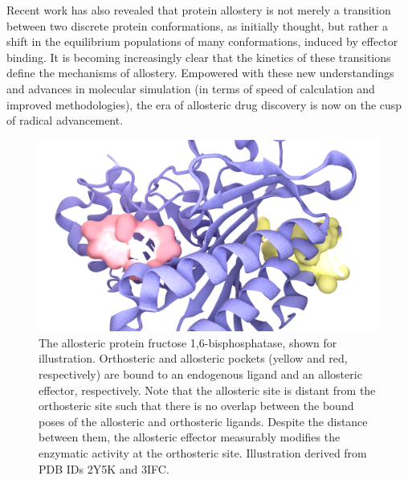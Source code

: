 \par Recent work has also revealed that protein allostery is not merely a transition between two discrete protein conformations, as initially thought, but rather a shift in the equilibrium populations of many conformations, induced by effector binding.\cite{Cooper1984a,Tsai2008a,Zhou2010b,Malmstrom2015,Pontiggia2015,Greives2014,Guo2015a} It is becoming increasingly clear that the kinetics of these transitions define the mechanisms of allostery.\cite{Zhou2010b,Malmstrom2015} Empowered with these new understandings and advances in molecular simulation (in terms of speed of calculation and improved methodologies), the era of allosteric drug discovery is now on the cusp of radical advancement.


\begin{figure}[htbp]
\centering
\includegraphics[width=\textwidth]{./Figures/allostery_example.png}
\caption[Orthosteric and Allosteric Sites]{The allosteric protein fructose 1,6-bisphosphatase, shown for illustration. Orthosteric and allosteric pockets (yellow and red, respectively) are bound to an endogenous ligand and an allosteric effector, respectively. Note that the allosteric site is distant from the orthosteric site such that there is no overlap between the bound poses of the allosteric and orthosteric ligands. Despite the distance between them, the allosteric effector measurably modifies the enzymatic activity at the orthosteric site. Illustration derived from PDB IDs 2Y5K\cite{Hebeisen2011a} and 3IFC.\cite{Zarzycki2011a}}
\end{figure}
